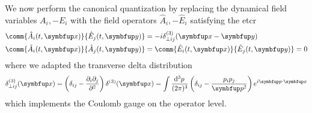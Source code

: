 We now perform the canonical quantization by replacing the dynamical field variables $A_i,-E_i$ with the field operators $\hat{A}_i,-\hat{E}_i$ satisfying the \gls{etcr}~\cite[p.~197]{Greiner2013}
\begin{align}
	\comm{\hat{A}_i(t,\vb{x})}{\hat{E}_j(t,\vb{y})}
	&=
	-i
	\delta^{(3)}_{\perp ij}(\vb{x}-\vb{y})
	\label{eq:equal_time_commutation_relation_nonzero}
	\\
	\comm{\hat{A}_i(t,\vb{x})}{\hat{A}_j(t,\vb{y})}
	&=
	\comm{\hat{E}_i(t,\vb{x})}{\hat{E}_j(t,\vb{y})}
	=
	0
	\label{eq:equal_time_commutation_relation_zero}
\end{align}
where we adapted the transverse delta distribution~\cite[p.~198]{Greiner2013}
\begin{equation}
	\delta^{(3)}_{\perp ij}(\vb{x})
	=
	\left(
		\delta_{ij}
		-
		\frac{\partial_i\partial_j}{\partial^2}
	\right)
	\delta^{(3)}(\vb{x})
	=
	\int\frac{\dd[3]{p}}{(2\pi)^3}
	\left(
		\delta_{ij}
		-
		\frac{p_ip_j}{\vb{p}^2}
	\right)
	e^{i\vb{p}\vdot\vb{x}}
	\label{eq:transverse_delta_distribution}
\end{equation}
which implements the Coulomb gauge on the operator level.

